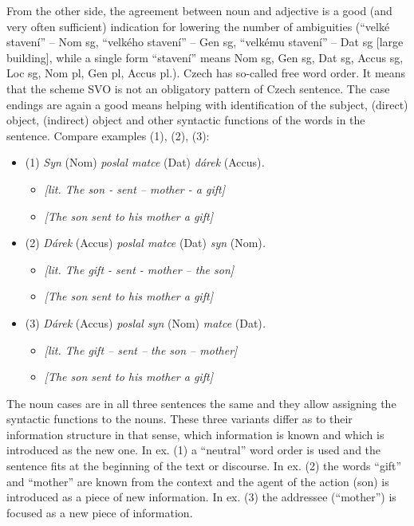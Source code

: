 \begin{multicols}{2}
From the other side, the agreement between noun and adjective is a good (and very often sufficient) indication for lowering the number of ambiguities (“velké stavení” – Nom sg, “velkého stavení” – Gen sg, “velkému stavení” – Dat sg {[}large building{]}, while a single form “stavení” means Nom sg, Gen sg, Dat sg, Accus sg, Loc sg, Nom pl, Gen pl, Accus pl.).
Czech has so-called free word order. It means that the scheme SVO is not an obligatory pattern of Czech sentence. The case endings are again a good means helping with identification of the subject, (direct) object, (indirect) object and other syntactic functions of the words in the sentence. Compare examples (1), (2), (3):
\begin{itemize}
\item[] (1) \textit{Syn} (Nom) \textit{poslal matce} (Dat) \textit{dárek} (Accus)\textit{.}
\begin{itemize}
	\item[] \textit{{[}lit. The son - sent – mother - a gift{]}}
	\item[] \textit{{[}The son sent to his mother a gift{]}}
\end{itemize}
\item[]  (2) \textit{Dárek} (Accus) \textit{poslal matce} (Dat) \textit{syn} (Nom)\textit{.}
\begin{itemize}	
	\item[] \textit{{[}lit. The gift - sent - mother – the son{]}}
	\item[] \textit{{[}The son sent to his mother a gift{]}}
\end{itemize}
\item[] (3) \textit{Dárek} (Accus) \textit{poslal syn} (Nom) \textit{matce} (Dat)\textit{.}
\begin{itemize}	
	\item[] \textit{{[}lit. The gift – sent – the son – mother{]}}
	\item[] \textit{{[}The son sent to his mother a gift{]}}
\end{itemize}
\end{itemize}
The noun cases are in all three sentences the same and they allow assigning the syntactic functions to the nouns. These three variants differ as to their information structure in that sense, which information is known and which is introduced as the new one. In ex. (1) a “neutral” word order is used and the sentence fits at the beginning of the text or discourse. In ex. (2) the words “gift” and “mother” are known from the context and the agent of the action (son) is introduced as a piece of new information. In ex. (3) the addressee (“mother”) is focused as a new piece of information.

\end{multicols}

